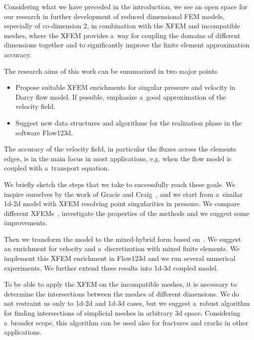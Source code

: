 Considering what we have preceded in the introduction, we see an open space for our research in further development of reduced dimensional FEM models,
especially of co-dimension 2, in combination with the XFEM and incompatible meshes, where the XFEM provides
a~way for coupling the domains of different dimensions together and to significantly improve the finite element approximation accuracy.

The research aims of this work can be summarized in two major points
\begin{itemize}
    \item Propose suitable XFEM enrichments for singular pressure and velocity in Darcy flow model. 
        If possible, emphasize a~good approximation of the velocity field.%
        
    \item Suggest new data structures and algorithms for the realization phase in the software Flow123d. 
\end{itemize}
The accuracy of the velocity field, in particular the fluxes across the elements edges, 
is in the main focus in most applications, e.g. when the flow model is coupled with a~transport equation.


We briefly sketch the steps that we take to successfully reach these goals.
We inspire ourselves by the work of Gracie and Craig~\cite{gracie_modelling_2010,craig_using_2011},
and we start from a~similar 1d-2d model with XFEM resolving point singularities in pressure.
We compare different XFEMs~\cite{fries_corrected_2008, fries_xfem_overview_2010, babuska_stable_2012,gupta_stable_2013},
investigate the properties of the methods and we suggest some improvements.

Then we transform the model to the mixed-hybrid form based on~\cite{brezina_mixed-hybrid_2010, sistek_bddc_2015}.
We suggest an enrichment for velocity and a~discretization with mixed finite elements.
We implement this XFEM enrichment in Flow123d and we run several numerical experiments.
We further extend these results into 1d-3d coupled model.

To be able to apply the XFEM on the incompatible meshes, it is necessary to determine the intersections
between the meshes of different dimensions. We do not restraint us only to 1d-2d and 1d-3d cases, but we suggest
a~robust algorithm for finding intersections of simplicial meshes in arbitrary 3d space.
Considering a~broader scope, this algorithm can be used also for fractures and cracks in other applications.


